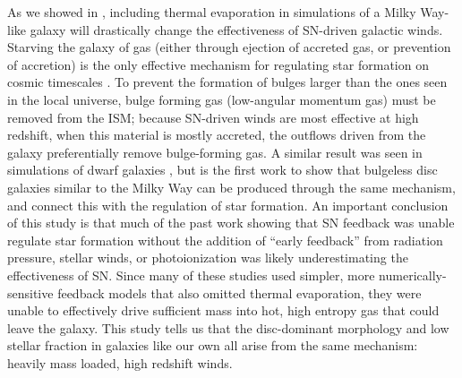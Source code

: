 As we showed in \citet{Keller2015}, including thermal evaporation in simulations
of a Milky Way-like galaxy will drastically change the effectiveness of
SN-driven galactic winds.  Starving the galaxy of gas (either through ejection
of accreted gas, or prevention of accretion) is the only effective mechanism for
regulating star formation on cosmic timescales \citet{Keres2009}.  To prevent
the formation of bulges larger than the ones seen in the local universe, bulge
forming gas (low-angular momentum gas) must be removed from the ISM; because
SN-driven winds are most effective at high redshift, when this material is
mostly accreted, the outflows driven from the galaxy preferentially remove
bulge-forming gas.  A similar result was seen in simulations of dwarf galaxies
\citep{Governato2010, Brook2011}, but \citet{Keller2015} is the first work to
show that bulgeless disc galaxies similar to the Milky Way can be
produced through the same mechanism, and connect this with the regulation of
star formation.  An important conclusion of this study is that much of the past
work \citep{Stinson2013,Agertz2013,Hopkins2014} showing that SN feedback was
unable regulate star formation without the addition of ``early feedback'' from
radiation pressure, stellar winds, or photoionization was likely underestimating
the effectiveness of SN.  Since many of these studies used simpler, more
numerically-sensitive feedback models that also omitted thermal evaporation,
they were unable to effectively drive sufficient mass into hot, high entropy gas
that could leave the galaxy.  This study tells us that the disc-dominant
morphology and low stellar fraction in galaxies like our own all arise from the
same mechanism:  heavily mass loaded, high redshift winds.


